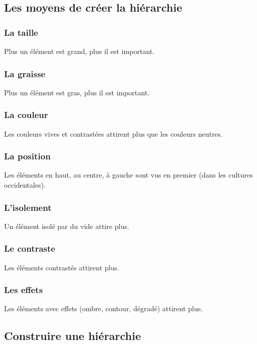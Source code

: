 \subsection{Les moyens de créer la hiérarchie}

\subsubsection{La taille}

Plus un élément est grand, plus il est important.

\subsubsection{La graisse}

Plus un élément est gras, plus il est important.

\subsubsection{La couleur}

Les couleurs vives et contrastées attirent plus que les couleurs neutres.

\subsubsection{La position}

Les éléments en haut, au centre, à gauche sont vus en premier (dans les cultures occidentales).

\subsubsection{L'isolement}

Un élément isolé par du vide attire plus.

\subsubsection{Le contraste}

Les éléments contrastés attirent plus.

\subsubsection{Les effets}

Les éléments avec effets (ombre, contour, dégradé) attirent plus.

\subsection{Construire une hiérarchie}

